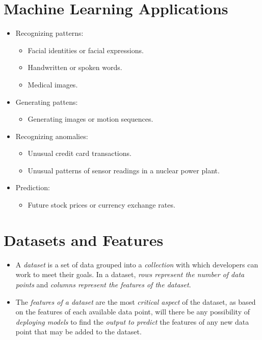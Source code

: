 \documentclass[
	number={1},
	title={Machine Learning Fundamentals}
]{cs584notes}
\begin{document}
\section{Machine Learning Applications}\label{sec:machine-learning-applications}
\begin{itemize}
	\item Recognizing patterns:
	\begin{itemize}
		\item Facial identities or facial expressions.
		\item Handwritten or spoken words.
		\item Medical images.
	\end{itemize}
	\item Generating pattens:
	\begin{itemize}
		\item Generating images or motion sequences.
	\end{itemize}
	\item Recognizing anomalies:
	\begin{itemize}
		\item Unusual credit card transactions.
		\item Unusual patterns of sensor readings in a nuclear power plant.
	\end{itemize}
	\item Prediction:
	\begin{itemize}
		\item Future stock prices or currency exchange rates.
	\end{itemize}
\end{itemize}

\section{Datasets and Features}\label{sec:datasets-and-features}
\begin{itemize}
	\item A \emph{dataset} is a set of data grouped into a \emph{collection} with which developers can work to meet their goals.
	In a dataset, \emph{rows represent the number of data points} and \emph{columns represent the features of the dataset}.
	\item The \emph{features of a dataset} are the most \emph{critical aspect} of the dataset, as based on the features of each available data point, will there be any possibility of \emph{deploying models} to find the \emph{output to predict} the features of any new data point that may be added to the dataset.
\end{itemize}
\end{document}

